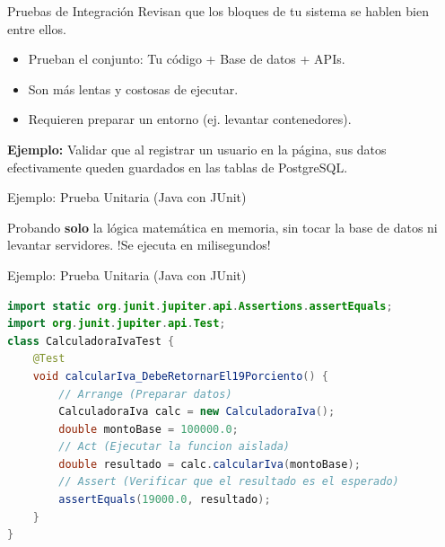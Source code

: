\documentclass[aspectratio=169]{beamer}
\begin{document}
\begin{frame}{Pruebas de Integración}
    Revisan que los bloques de tu sistema se hablen bien entre ellos.
    
    \vspace{0.3cm}
    \begin{alertbox}[Características]
        \begin{itemize}
            \item {\color{black}Prueban el conjunto: Tu código + Base de datos + APIs.}
            \item {\color{black}Son más lentas y costosas de ejecutar.}
            \item {\color{black}Requieren preparar un entorno (ej. levantar contenedores).}
        \end{itemize}
    \end{alertbox}
    
    \vspace{0.3cm}
    \textbf{Ejemplo:} Validar que al registrar un usuario en la página, sus datos efectivamente queden guardados en las tablas de PostgreSQL.
\end{frame}


\begin{frame}[fragile]{Ejemplo: Prueba Unitaria (Java con JUnit)}
    \begin{darkbox}
        Probando \textbf{solo} la l\'ogica matem\'atica en memoria, sin tocar la base de datos ni levantar servidores. !Se ejecuta en milisegundos!
    \end{darkbox}

\end{frame}
\begin{frame}[fragile]{Ejemplo: Prueba Unitaria (Java con JUnit)}
    
    \vspace{-0.4cm}
    \begin{codebox}
\begin{lstlisting}[language=Java, basicstyle=\color{gludWhite}\ttfamily\scriptsize, keywordstyle=\color{gludOrange}\bfseries, stringstyle=\color{gludOrangeLight}, commentstyle=\color{gludLightGray}\itshape, backgroundcolor=\color{gludDarker}]
import static org.junit.jupiter.api.Assertions.assertEquals;
import org.junit.jupiter.api.Test;
class CalculadoraIvaTest {
    @Test
    void calcularIva_DebeRetornarEl19Porciento() {
        // Arrange (Preparar datos)
        CalculadoraIva calc = new CalculadoraIva();
        double montoBase = 100000.0;
        // Act (Ejecutar la funcion aislada)
        double resultado = calc.calcularIva(montoBase);
        // Assert (Verificar que el resultado es el esperado)
        assertEquals(19000.0, resultado);
    }
}
\end{lstlisting}
    \end{codebox}
\end{frame}
\end{document}
